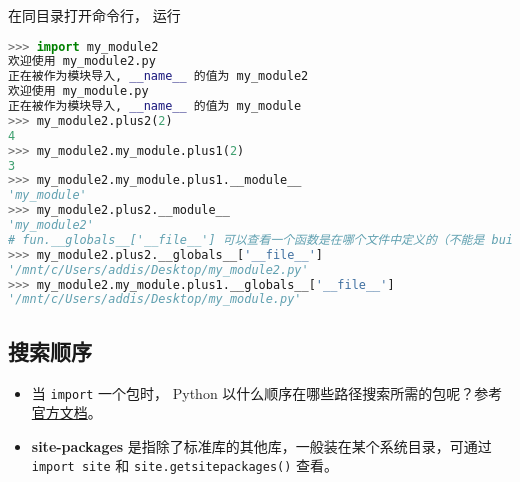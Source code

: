 在同目录打开命令行， 运行
\begin{lstlisting}[language=python]
>>> import my_module2
欢迎使用 my_module2.py
正在被作为模块导入, __name__ 的值为 my_module2
欢迎使用 my_module.py
正在被作为模块导入, __name__ 的值为 my_module
>>> my_module2.plus2(2)
4
>>> my_module2.my_module.plus1(2)
3
>>> my_module2.my_module.plus1.__module__
'my_module'
>>> my_module2.plus2.__module__
'my_module2'
# fun.__globals__['__file__'] 可以查看一个函数是在哪个文件中定义的（不能是 builtin 函数）。
>>> my_module2.plus2.__globals__['__file__']
'/mnt/c/Users/addis/Desktop/my_module2.py'
>>> my_module2.my_module.plus1.__globals__['__file__']
'/mnt/c/Users/addis/Desktop/my_module.py'
\end{lstlisting}

\subsection{搜索顺序}
\begin{itemize}
\item 当 \verb`import` 一个包时， Python 以什么顺序在哪些路径搜索所需的包呢？参考\href{https://docs.python.org/3/tutorial/modules.html#the-module-search-path}{官方文档}。
\item \textbf{site-packages} 是指除了标准库的其他库，一般装在某个系统目录，可通过 \verb`import site` 和 \verb`site.getsitepackages()` 查看。
\end{itemize}
